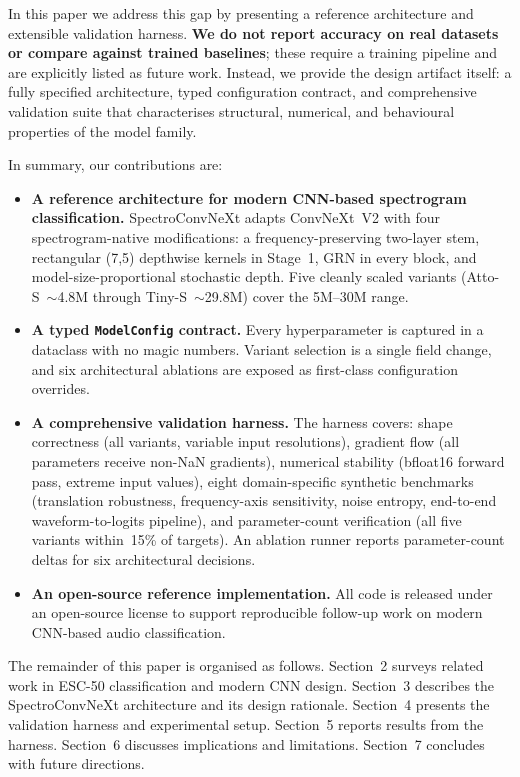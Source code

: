 \documentclass{article}
\begin{document}
In this paper we address this gap by presenting a reference architecture and
extensible validation harness. \textbf{We do not report accuracy on real
datasets or compare against trained baselines}; these require a training
pipeline and are explicitly listed as future work. Instead, we provide the
design artifact itself: a fully specified architecture, typed configuration
contract, and comprehensive validation suite that characterises structural,
numerical, and behavioural properties of the model family.

In summary, our contributions are:
\begin{itemize}
  \item \textbf{A reference architecture for modern CNN-based spectrogram
  classification.} SpectroConvNeXt adapts ConvNeXt~V2 with four spectrogram-native
  modifications: a frequency-preserving two-layer stem, rectangular (7,5)
  depthwise kernels in Stage~1, GRN in every block, and
  model-size-proportional stochastic depth. Five cleanly scaled variants
  (Atto-S~$\sim$4.8M through Tiny-S~$\sim$29.8M) cover the 5M--30M range.
  \item \textbf{A typed \texttt{ModelConfig} contract.} Every hyperparameter is
  captured in a dataclass with no magic numbers. Variant selection is a single
  field change, and six architectural ablations are exposed as first-class
  configuration overrides.
  \item \textbf{A comprehensive validation harness.} The harness covers: shape
  correctness (all variants, variable input resolutions), gradient flow
  (all parameters receive non-NaN gradients), numerical stability (bfloat16
  forward pass, extreme input values), eight domain-specific synthetic
  benchmarks (translation robustness, frequency-axis sensitivity, noise
  entropy, end-to-end waveform-to-logits pipeline), and parameter-count
  verification (all five variants within~15\% of targets). An ablation runner
  reports parameter-count deltas for six architectural decisions.
  \item \textbf{An open-source reference implementation.} All code is released
  under an open-source license to support reproducible follow-up work on
  modern CNN-based audio classification.
\end{itemize}

The remainder of this paper is organised as follows. Section~2 surveys related
work in ESC-50 classification and modern CNN design. Section~3 describes the
SpectroConvNeXt architecture and its design rationale. Section~4 presents the
validation harness and experimental setup. Section~5 reports results from the
harness. Section~6 discusses implications and limitations. Section~7 concludes
with future directions.
\end{document}
